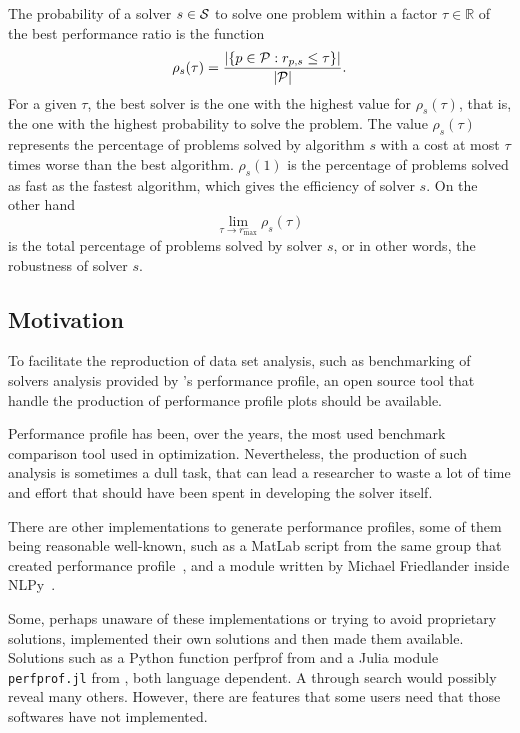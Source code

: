     The probability of a solver $s \in \mathcal{S}$  to solve one problem within a
    factor $\tau \in \mathds{R}$ of the best performance ratio is the function
    \begin{align*}
      \rho_s(\tau) = \frac{| \{p \in \mathcal{P}: r_{p,s} \leq \tau\} |}{| \mathcal{P} |}.
    \end{align*}
    For a given $\tau$, the best solver is the one with the highest value for
    $\rho_s(\tau)$, that is, the one with the highest probability to solve the
    problem.
    The value $\rho_s(\tau)$ represents the percentage of problems solved by
    algorithm $s$ with a cost at most $\tau$ times worse than the best
    algorithm. $\rho_s(1)$ is the percentage of problems solved as fast as the
    fastest algorithm, which gives the efficiency of solver $s$.
    On the other hand
    \[\displaystyle \lim_{\tau\rightarrow r^-_{\max}} \rho_s(\tau)\]
    is the total percentage of problems solved by solver $s$, or in
    other words, the robustness of solver $s$.

\subsection*{Motivation}

    To facilitate the reproduction of data set analysis, such as 
    benchmarking of solvers analysis provided by \textcite{Dolan:2002du}'s
    performance profile,  an open source tool that handle
    the production of performance profile plots should be available.

    Performance profile has been, over the years, the most used benchmark
    comparison tool used in optimization. Nevertheless, the production of such
    analysis is sometimes a dull task, that can lead a researcher to waste a lot
    of time and effort that should have been spent in developing the solver
    itself.

    There are other
    implementations to generate  performance profiles,
    some of them being reasonable well-known, such as a MatLab
    script from
    the same group that created  performance profile~\cite{url:cops},
    and a module written by Michael Friedlander inside NLPy~\cite{url:NLPy}.

    Some, perhaps unaware of these implementations or trying to avoid
    proprietary solutions, implemented their own solutions and then made
    them
    available. Solutions such as a Python function perfprof from \textcite
    {url:perfprof}
    and a  Julia module {\tt perfprof.jl} from \textcite{url:perfprofjl}, 
    both language dependent. A through search would possibly reveal many
    others.  However, there are features that some users need that those softwares have
    not implemented.

